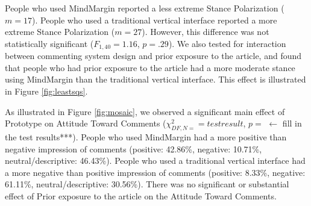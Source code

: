 People who used MindMargin reported a less extreme Stance Polarization ($m=17$). People who used a traditional vertical interface reported a more extreme Stance Polarization ($m=27$). However, this difference was not statistically significant ($F_{1,40}=1.16$, $p=.29$). We also tested for interaction between commenting system design and prior exposure to the article, and found that people who had prior exposure to the article had a more moderate stance using MindMargin than the traditional vertical interface. This effect is illustrated in Figure \ref{fig:leastsqs}. 




As illustrated in Figure \ref{fig:mosaic}, we observed a significant main effect of Prototype on Attitude Toward Comments ($\chi^2_{DF,N=}=test result$, $p=   $ $\leftarrow$ fill in the test results***).
People who used MindMargin had a more positive than negative impression of comments (positive: 42.86\%, negative: 10.71\%, neutral/descriptive: 46.43\%). People who used a traditional vertical interface had a more negative than positive impression of comments (positive: 8.33\%, negative: 61.11\%, neutral/descriptive: 30.56\%). There was no significant or substantial effect of Prior exposure to the article on the Attitude Toward Comments.  %

